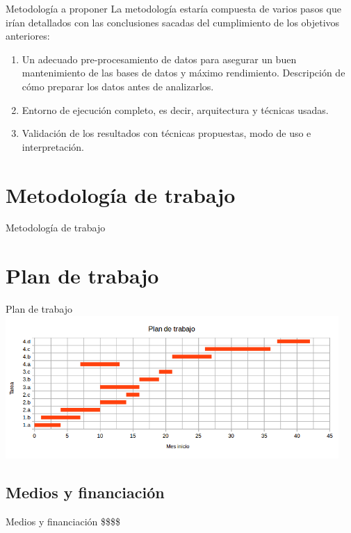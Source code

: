 \documentclass{beamer}
\begin{document}
\begin{frame}{Metodología a proponer}
La metodología estaría compuesta de varios pasos que irían detallados con las conclusiones sacadas del cumplimiento de los objetivos anteriores:

\begin{enumerate}
  \item<1-> Un adecuado pre-procesamiento de datos para asegurar un buen mantenimiento de las bases de datos y máximo rendimiento. Descripción de cómo preparar los datos antes de analizarlos.
  \item<2-> Entorno de ejecución completo, es decir, arquitectura y técnicas usadas.
  \item<3-> Validación de los resultados con técnicas propuestas, modo de uso e interpretación.
\end{enumerate}

\end{frame}

\section{Metodología de trabajo}

\begin{frame}{Metodología de trabajo}

\end{frame}

\section{Plan de trabajo}

\begin{frame}{Plan de trabajo}
\includegraphics[width=0.95\textwidth]{./imgs/especiedegantt.png}
\end{frame}

\subsection{Medios y financiación}

\begin{frame}{Medios y financiación}
\$\$\$\$
\end{frame}
\end{document}
